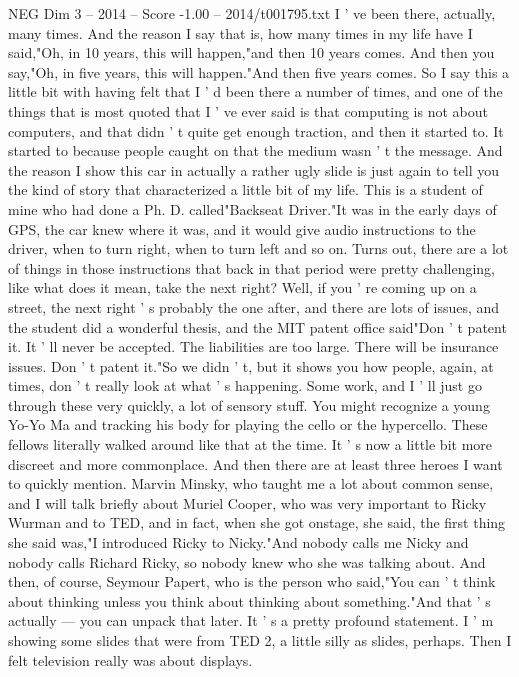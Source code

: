 \begin{textsample}{NEG Dim 3 – 2014 – Score -1.00 – 2014/t001795.txt}
I ' ve been there, actually, many times.
And the reason I say that is, how many times in my life have I said,"Oh, in 10 years, this will happen,"and then 10 years comes.
And then you say,"Oh, in five years, this will happen."And then five years comes.
So I say this a little bit with having felt that I ' d been there a number of times, and one of the things that is most quoted that I ' ve ever said is that computing is not about computers, and that didn ' t quite get enough traction, and then it started to.
It started to because people caught on that the medium wasn ' t the message.
And the reason I show this car in actually a rather ugly slide is just again to tell you the kind of story that characterized a little bit of my life.
This is a student of mine who had done a Ph.
D. called"Backseat Driver."It was in the early days of GPS, the car knew where it was, and it would give audio instructions to the driver, when to turn right, when to turn left and so on.
Turns out, there are a lot of things in those instructions that back in that period were pretty challenging, like what does it mean, take the next right?
Well, if you ' re coming up on a street, the next right ' s probably the one after, and there are lots of issues, and the student did a wonderful thesis, and the MIT patent office said"Don ' t patent it.
It ' ll never be accepted.
The liabilities are too large.
There will be insurance issues.
Don ' t patent it."So we didn ' t, but it shows you how people, again, at times, don ' t really look at what ' s happening.
Some work, and I ' ll just go through these very quickly, a lot of sensory stuff.
You might recognize a young Yo-Yo Ma and tracking his body for playing the cello or the hypercello.
These fellows literally walked around like that at the time.
It ' s now a little bit more discreet and more commonplace.
And then there are at least three heroes I want to quickly mention.
Marvin Minsky, who taught me a lot about common sense, and I will talk briefly about Muriel Cooper, who was very important to Ricky Wurman and to TED, and in fact, when she got onstage, she said, the first thing she said was,"I introduced Ricky to Nicky."And nobody calls me Nicky and nobody calls Richard Ricky, so nobody knew who she was talking about.
And then, of course, Seymour Papert, who is the person who said,"You can ' t think about thinking unless you think about thinking about something."And that ' s actually — you can unpack that later.
It ' s a pretty profound statement.
I ' m showing some slides that were from TED 2, a little silly as slides, perhaps.
Then I felt television really was about displays.

\end{textsample}
